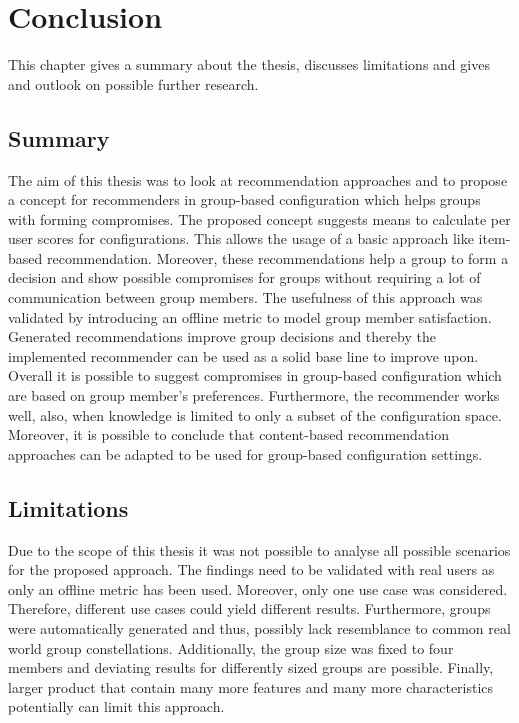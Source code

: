 \chapter{Conclusion}
\label{ch:Conclusion}

This chapter gives a summary about the thesis, discusses limitations and gives and outlook on possible further research.

\section{Summary}
\label{sec:Conclusion:Summary}

The aim of this thesis was to look at recommendation approaches and to propose a concept for recommenders in group-based configuration which helps groups with forming compromises. The proposed concept suggests means to calculate per user scores for configurations. This allows the usage of a basic approach like item-based recommendation. Moreover, these recommendations help a group to form a decision and show possible compromises for groups without requiring a lot of communication between group members. The usefulness of this approach was validated by introducing an offline metric to model group member satisfaction. Generated recommendations improve group decisions and thereby the implemented recommender can be used as a solid base line to improve upon. 
Overall it is possible to suggest compromises in group-based configuration which are based on group member's preferences. Furthermore, the recommender works well, also, when knowledge is limited to only a subset of the configuration space. Moreover, it is possible to conclude that content-based recommendation approaches can be adapted to be used for group-based configuration settings.

\section{Limitations}
\label{sec:Conclusion:Limitations}

Due to the scope of this thesis it was not possible to analyse all possible scenarios for the proposed approach. The findings need to be validated with real users as only an offline metric has been used. Moreover, only one use case was considered. Therefore, different use cases could yield different results. Furthermore, groups were automatically generated and thus, possibly lack resemblance to common real world group constellations. Additionally, the group size was fixed to four members and deviating results for differently sized groups are possible. Finally, larger product that contain many more features and many more characteristics potentially can limit this approach.

